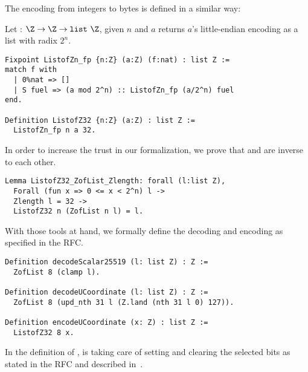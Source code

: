 The encoding from integers to bytes is defined in a similar way:
\begin{dfn}
Let  : $\Z \rightarrow \Z \rightarrow \texttt{list}~\Z$, given
$n$ and $a$ returns $a$'s little-endian encoding as a list with radix $2^n$.
\end{dfn}
\begin{lstlisting}[language=Coq,aboveskip=0pt,belowskip=1pt]
Fixpoint ListofZn_fp {n:Z} (a:Z) (f:nat) : list Z :=
match f with
  | 0%nat => []
  | S fuel => (a mod 2^n) :: ListofZn_fp (a/2^n) fuel
end.

Definition ListofZ32 {n:Z} (a:Z) : list Z :=
  ListofZn_fp n a 32.
\end{lstlisting}
In order to increase the trust in our formalization, we prove that
 and  are inverse to each other.
\begin{lstlisting}[language=Coq,aboveskip=0pt,belowskip=1pt]
Lemma ListofZ32_ZofList_Zlength: forall (l:list Z),
  Forall (fun x => 0 <= x < 2^n) l ->
  Zlength l = 32 ->
  ListofZ32 n (ZofList n l) = l.
\end{lstlisting}

With those tools at hand, we formally define the decoding and encoding as
specified in the RFC.
\begin{lstlisting}[language=Coq]
Definition decodeScalar25519 (l: list Z) : Z :=
  ZofList 8 (clamp l).

Definition decodeUCoordinate (l: list Z) : Z :=
  ZofList 8 (upd_nth 31 l (Z.land (nth 31 l 0) 127)).

Definition encodeUCoordinate (x: Z) : list Z :=
  ListofZ32 8 x.
\end{lstlisting}

In the definition of ,  is taking care of
setting and clearing the selected bits as stated in the RFC and described
in~.
